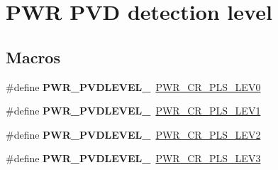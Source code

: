 \hypertarget{group___p_w_r___p_v_d__detection__level}{}\section{P\+WR P\+VD detection level}
\label{group___p_w_r___p_v_d__detection__level}
\subsection*{Macros}
\begin{DoxyCompactItemize}
\item 
\mbox{\label{group___p_w_r___p_v_d__detection__level_gaddf4616a143ac3481f3043f2a4c21c18}} 
\#define {\bfseries P\+W\+R\+\_\+\+P\+V\+D\+L\+E\+V\+E\+L\+\_}~\hyperlink{group___peripheral___registers___bits___definition_gacb6b904b20d7e4fff958c75748861216}{P\+W\+R\+\_\+\+C\+R\+\_\+\+P\+L\+S\+\_\+\+L\+E\+V0}
\item 
\mbox{\label{group___p_w_r___p_v_d__detection__level_ga06e55b20a8777594f1a91ee71fac1f79}} 
\#define {\bfseries P\+W\+R\+\_\+\+P\+V\+D\+L\+E\+V\+E\+L\+\_}~\hyperlink{group___peripheral___registers___bits___definition_ga15b71263f73f0c4e53ca91fc8d096818}{P\+W\+R\+\_\+\+C\+R\+\_\+\+P\+L\+S\+\_\+\+L\+E\+V1}
\item 
\mbox{\label{group___p_w_r___p_v_d__detection__level_gab26bb78650bbaef26ac9f9123c791cc7}} 
\#define {\bfseries P\+W\+R\+\_\+\+P\+V\+D\+L\+E\+V\+E\+L\+\_}~\hyperlink{group___peripheral___registers___bits___definition_ga2ea128abc2fc4252b53d09ca2850e69e}{P\+W\+R\+\_\+\+C\+R\+\_\+\+P\+L\+S\+\_\+\+L\+E\+V2}
\item 
\mbox{\label{group___p_w_r___p_v_d__detection__level_ga7b751743b3e29c237e6a0e1d7bdd0503}} 
\#define {\bfseries P\+W\+R\+\_\+\+P\+V\+D\+L\+E\+V\+E\+L\+\_}~\hyperlink{group___peripheral___registers___bits___definition_ga9c1782980a2fb12de80058729a74f174}{P\+W\+R\+\_\+\+C\+R\+\_\+\+P\+L\+S\+\_\+\+L\+E\+V3}
\item 
\mbox{\label{group___p_w_r___p_v_d__detection__level_ga03c0d3ae547deb1a51b8acafac101698}} 

\end{DoxyCompactItemize}
